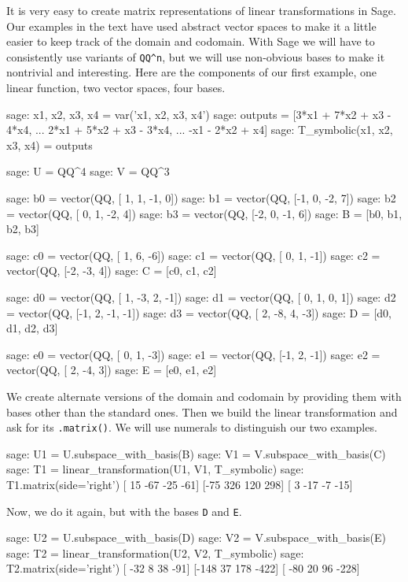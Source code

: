 It is very easy to create matrix representations of linear transformations in Sage.  Our examples in the text have used abstract vector spaces to make it a little easier to keep track of the domain and codomain.  With Sage we will have to consistently use variants of \verb?QQ^n?, but we will use non-obvious bases to make it nontrivial and interesting.  Here are the components of our first example, one linear function, two vector spaces, four bases.
%
\begin{sageexample}
sage: x1, x2, x3, x4 = var('x1, x2, x3, x4')
sage: outputs = [3*x1 + 7*x2 + x3 - 4*x4,
...              2*x1 + 5*x2 + x3 - 3*x4,
...               -x1 - 2*x2      +   x4]
sage: T_symbolic(x1, x2, x3, x4) = outputs

sage: U = QQ^4
sage: V = QQ^3

sage: b0 = vector(QQ, [ 1, 1, -1, 0])
sage: b1 = vector(QQ, [-1, 0, -2, 7])
sage: b2 = vector(QQ, [ 0, 1, -2, 4])
sage: b3 = vector(QQ, [-2, 0, -1, 6])
sage: B = [b0, b1, b2, b3]

sage: c0 = vector(QQ, [ 1,  6, -6])
sage: c1 = vector(QQ, [ 0,  1, -1])
sage: c2 = vector(QQ, [-2, -3,  4])
sage: C = [c0, c1, c2]

sage: d0 = vector(QQ, [ 1, -3,  2, -1])
sage: d1 = vector(QQ, [ 0,  1,  0,  1])
sage: d2 = vector(QQ, [-1,  2, -1, -1])
sage: d3 = vector(QQ, [ 2, -8,  4, -3])
sage: D = [d0, d1, d2, d3]

sage: e0 = vector(QQ, [ 0,  1, -3])
sage: e1 = vector(QQ, [-1,  2, -1])
sage: e2 = vector(QQ, [ 2, -4,  3])
sage: E = [e0, e1, e2]

\end{sageexample}
%
We create alternate versions of the domain and codomain by providing them with bases other than the standard ones.  Then we build the linear transformation and ask for its \verb?.matrix()?.  We will use numerals to distinguish our two examples.
%
\begin{sageexample}
sage: U1 = U.subspace_with_basis(B)
sage: V1 = V.subspace_with_basis(C)
sage: T1 = linear_transformation(U1, V1, T_symbolic)
sage: T1.matrix(side='right')
[ 15 -67 -25 -61]
[-75 326 120 298]
[  3 -17  -7 -15]
\end{sageexample}
%
Now, we do it again, but with the bases \verb?D? and \verb?E?.
%
\begin{sageexample}
sage: U2 = U.subspace_with_basis(D)
sage: V2 = V.subspace_with_basis(E)
sage: T2 = linear_transformation(U2, V2, T_symbolic)
sage: T2.matrix(side='right')
[ -32    8   38  -91]
[-148   37  178 -422]
[ -80   20   96 -228]
\end{sageexample}
